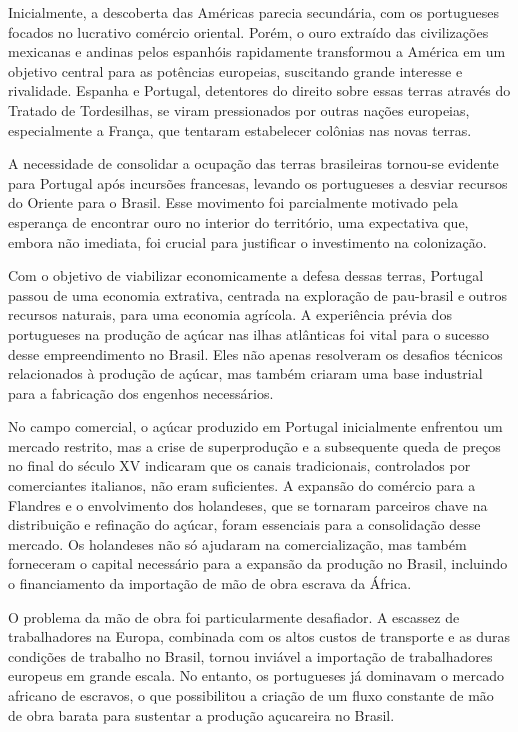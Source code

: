 \documentclass[a4paper,12pt]{article}[abntex2]
\begin{document}
Inicialmente, a descoberta das Américas parecia secundária, com os portugueses focados no lucrativo comércio oriental. Porém, o ouro extraído das civilizações mexicanas e andinas pelos espanhóis rapidamente transformou a América em um objetivo central para as potências europeias, suscitando grande interesse e rivalidade. Espanha e Portugal, detentores do direito sobre essas terras através do Tratado de Tordesilhas, se viram pressionados por outras nações europeias, especialmente a França, que tentaram estabelecer colônias nas novas terras.

A necessidade de consolidar a ocupação das terras brasileiras tornou-se evidente para Portugal após incursões francesas, levando os portugueses a desviar recursos do Oriente para o Brasil. Esse movimento foi parcialmente motivado pela esperança de encontrar ouro no interior do território, uma expectativa que, embora não imediata, foi crucial para justificar o investimento na colonização.

Com o objetivo de viabilizar economicamente a defesa dessas terras, Portugal passou de uma economia extrativa, centrada na exploração de pau-brasil e outros recursos naturais, para uma economia agrícola. A experiência prévia dos portugueses na produção de açúcar nas ilhas atlânticas foi vital para o sucesso desse empreendimento no Brasil. Eles não apenas resolveram os desafios técnicos relacionados à produção de açúcar, mas também criaram uma base industrial para a fabricação dos engenhos necessários.

No campo comercial, o açúcar produzido em Portugal inicialmente enfrentou um mercado restrito, mas a crise de superprodução e a subsequente queda de preços no final do século XV indicaram que os canais tradicionais, controlados por comerciantes italianos, não eram suficientes. A expansão do comércio para a Flandres e o envolvimento dos holandeses, que se tornaram parceiros chave na distribuição e refinação do açúcar, foram essenciais para a consolidação desse mercado. Os holandeses não só ajudaram na comercialização, mas também forneceram o capital necessário para a expansão da produção no Brasil, incluindo o financiamento da importação de mão de obra escrava da África.

O problema da mão de obra foi particularmente desafiador. A escassez de trabalhadores na Europa, combinada com os altos custos de transporte e as duras condições de trabalho no Brasil, tornou inviável a importação de trabalhadores europeus em grande escala. No entanto, os portugueses já dominavam o mercado africano de escravos, o que possibilitou a criação de um fluxo constante de mão de obra barata para sustentar a produção açucareira no Brasil.
\end{document}
